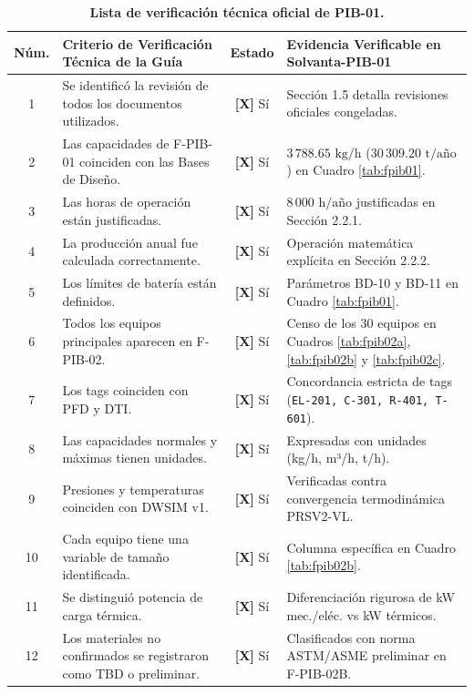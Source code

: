 \documentclass[10pt,letterpaper]{article}
\begin{document}
\begin{table}[H]
\centering\small
\setlength{\tabcolsep}{5pt}
\renewcommand{\arraystretch}{1.15}
\caption{\textbf{Lista de verificación técnica oficial de PIB-01.}} \label{tab:lista_verificacion}
\begin{tabularx}{\textwidth}{c X c p{5.5cm}}
\toprule
\rowcolor{tableheader}
\color{white}\textbf{Núm.} & \color{white}\textbf{Criterio de Verificación Técnica de la Guía} & \color{white}\textbf{Estado} & \color{white}\textbf{Evidencia Verificable en Solvanta-PIB-01} \\
\midrule
1 & Se identificó la revisión de todos los documentos utilizados. & \textbf{[X]} Sí & Sección 1.5 detalla revisiones oficiales congeladas. \\
2 & Las capacidades de F-PIB-01 coinciden con las Bases de Diseño. & \textbf{[X]} Sí & $3\,788.65\text{ kg/h}$ ($30\,309.20\text{ t/año}$) en Cuadro \ref{tab:fpib01}. \\
3 & Las horas de operación están justificadas. & \textbf{[X]} Sí & $8\,000\text{ h/año}$ justificadas en Sección 2.2.1. \\
4 & La producción anual fue calculada correctamente. & \textbf{[X]} Sí & Operación matemática explícita en Sección 2.2.2. \\
5 & Los límites de batería están definidos. & \textbf{[X]} Sí & Parámetros BD-10 y BD-11 en Cuadro \ref{tab:fpib01}. \\
6 & Todos los equipos principales aparecen en F-PIB-02. & \textbf{[X]} Sí & Censo de los 30 equipos en Cuadros \ref{tab:fpib02a}, \ref{tab:fpib02b} y \ref{tab:fpib02c}. \\
7 & Los tags coinciden con PFD y DTI. & \textbf{[X]} Sí & Concordancia estricta de tags (\texttt{EL-201, C-301, R-401, T-601}). \\
8 & Las capacidades normales y máximas tienen unidades. & \textbf{[X]} Sí & Expresadas con unidades (kg/h, m³/h, t/h). \\
9 & Presiones y temperaturas coinciden con DWSIM v1. & \textbf{[X]} Sí & Verificadas contra convergencia termodinámica PRSV2-VL. \\
10 & Cada equipo tiene una variable de tamaño identificada. & \textbf{[X]} Sí & Columna específica en Cuadro \ref{tab:fpib02b}. \\
11 & Se distinguió potencia de carga térmica. & \textbf{[X]} Sí & Diferenciación rigurosa de kW mec./eléc. vs kW térmicos. \\
12 & Los materiales no confirmados se registraron como TBD o preliminar. & \textbf{[X]} Sí & Clasificados con norma ASTM/ASME preliminar en F-PIB-02B. \\

\end{tabularx}
\end{table}
\end{document}

